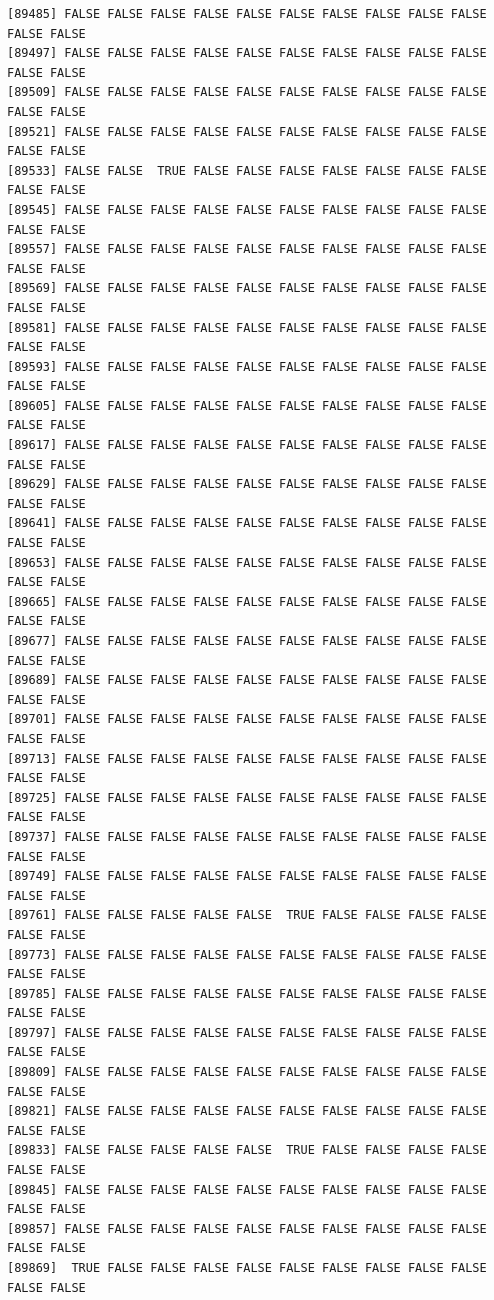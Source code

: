 \documentclass[
  a4paper,
  DIV=11,
  numbers=noendperiod]{scrartcl}
\begin{document}
\begin{verbatim}
[89485] FALSE FALSE FALSE FALSE FALSE FALSE FALSE FALSE FALSE FALSE FALSE FALSE
[89497] FALSE FALSE FALSE FALSE FALSE FALSE FALSE FALSE FALSE FALSE FALSE FALSE
[89509] FALSE FALSE FALSE FALSE FALSE FALSE FALSE FALSE FALSE FALSE FALSE FALSE
[89521] FALSE FALSE FALSE FALSE FALSE FALSE FALSE FALSE FALSE FALSE FALSE FALSE
[89533] FALSE FALSE  TRUE FALSE FALSE FALSE FALSE FALSE FALSE FALSE FALSE FALSE
[89545] FALSE FALSE FALSE FALSE FALSE FALSE FALSE FALSE FALSE FALSE FALSE FALSE
[89557] FALSE FALSE FALSE FALSE FALSE FALSE FALSE FALSE FALSE FALSE FALSE FALSE
[89569] FALSE FALSE FALSE FALSE FALSE FALSE FALSE FALSE FALSE FALSE FALSE FALSE
[89581] FALSE FALSE FALSE FALSE FALSE FALSE FALSE FALSE FALSE FALSE FALSE FALSE
[89593] FALSE FALSE FALSE FALSE FALSE FALSE FALSE FALSE FALSE FALSE FALSE FALSE
[89605] FALSE FALSE FALSE FALSE FALSE FALSE FALSE FALSE FALSE FALSE FALSE FALSE
[89617] FALSE FALSE FALSE FALSE FALSE FALSE FALSE FALSE FALSE FALSE FALSE FALSE
[89629] FALSE FALSE FALSE FALSE FALSE FALSE FALSE FALSE FALSE FALSE FALSE FALSE
[89641] FALSE FALSE FALSE FALSE FALSE FALSE FALSE FALSE FALSE FALSE FALSE FALSE
[89653] FALSE FALSE FALSE FALSE FALSE FALSE FALSE FALSE FALSE FALSE FALSE FALSE
[89665] FALSE FALSE FALSE FALSE FALSE FALSE FALSE FALSE FALSE FALSE FALSE FALSE
[89677] FALSE FALSE FALSE FALSE FALSE FALSE FALSE FALSE FALSE FALSE FALSE FALSE
[89689] FALSE FALSE FALSE FALSE FALSE FALSE FALSE FALSE FALSE FALSE FALSE FALSE
[89701] FALSE FALSE FALSE FALSE FALSE FALSE FALSE FALSE FALSE FALSE FALSE FALSE
[89713] FALSE FALSE FALSE FALSE FALSE FALSE FALSE FALSE FALSE FALSE FALSE FALSE
[89725] FALSE FALSE FALSE FALSE FALSE FALSE FALSE FALSE FALSE FALSE FALSE FALSE
[89737] FALSE FALSE FALSE FALSE FALSE FALSE FALSE FALSE FALSE FALSE FALSE FALSE
[89749] FALSE FALSE FALSE FALSE FALSE FALSE FALSE FALSE FALSE FALSE FALSE FALSE
[89761] FALSE FALSE FALSE FALSE FALSE  TRUE FALSE FALSE FALSE FALSE FALSE FALSE
[89773] FALSE FALSE FALSE FALSE FALSE FALSE FALSE FALSE FALSE FALSE FALSE FALSE
[89785] FALSE FALSE FALSE FALSE FALSE FALSE FALSE FALSE FALSE FALSE FALSE FALSE
[89797] FALSE FALSE FALSE FALSE FALSE FALSE FALSE FALSE FALSE FALSE FALSE FALSE
[89809] FALSE FALSE FALSE FALSE FALSE FALSE FALSE FALSE FALSE FALSE FALSE FALSE
[89821] FALSE FALSE FALSE FALSE FALSE FALSE FALSE FALSE FALSE FALSE FALSE FALSE
[89833] FALSE FALSE FALSE FALSE FALSE  TRUE FALSE FALSE FALSE FALSE FALSE FALSE
[89845] FALSE FALSE FALSE FALSE FALSE FALSE FALSE FALSE FALSE FALSE FALSE FALSE
[89857] FALSE FALSE FALSE FALSE FALSE FALSE FALSE FALSE FALSE FALSE FALSE FALSE
[89869]  TRUE FALSE FALSE FALSE FALSE FALSE FALSE FALSE FALSE FALSE FALSE FALSE

\end{verbatim}
\end{document}
